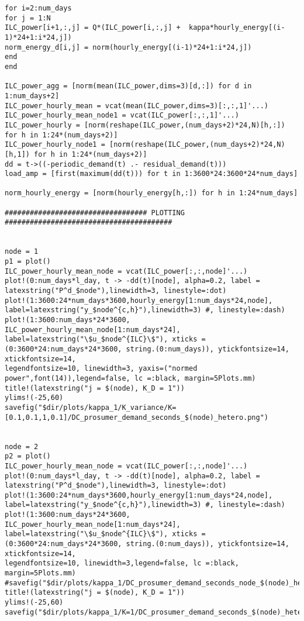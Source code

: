 \begin{lstlisting}
for i=2:num_days
for j = 1:N
ILC_power[i+1,:,j] = Q*(ILC_power[i,:,j] +  kappa*hourly_energy[(i-1)*24+1:i*24,j])
norm_energy_d[i,j] = norm(hourly_energy[(i-1)*24+1:i*24,j])
end
end

ILC_power_agg = [norm(mean(ILC_power,dims=3)[d,:]) for d in 1:num_days+2]
ILC_power_hourly_mean = vcat(mean(ILC_power,dims=3)[:,:,1]'...)
ILC_power_hourly_mean_node1 = vcat(ILC_power[:,:,1]'...)
ILC_power_hourly = [norm(reshape(ILC_power,(num_days+2)*24,N)[h,:]) for h in 1:24*(num_days+2)]
ILC_power_hourly_node1 = [norm(reshape(ILC_power,(num_days+2)*24,N)[h,1]) for h in 1:24*(num_days+2)]
dd = t->((-periodic_demand(t) .- residual_demand(t)))
load_amp = [first(maximum(dd(t))) for t in 1:3600*24:3600*24*num_days]

norm_hourly_energy = [norm(hourly_energy[h,:]) for h in 1:24*num_days]

################################## PLOTTING ########################################


node = 1
p1 = plot()
ILC_power_hourly_mean_node = vcat(ILC_power[:,:,node]'...)
plot!(0:num_days*l_day, t -> -dd(t)[node], alpha=0.2, label = latexstring("P^d_$node"),linewidth=3, linestyle=:dot)
plot!(1:3600:24*num_days*3600,hourly_energy[1:num_days*24,node], label=latexstring("y_$node^{c,h}"),linewidth=3) #, linestyle=:dash)
plot!(1:3600:num_days*24*3600,  ILC_power_hourly_mean_node[1:num_days*24], label=latexstring("\$u_$node^{ILC}\$"), xticks = (0:3600*24:num_days*24*3600, string.(0:num_days)), ytickfontsize=14,
xtickfontsize=14,
legendfontsize=10, linewidth=3, yaxis=("normed power",font(14)),legend=false, lc =:black, margin=5Plots.mm)
title!(latexstring("j = $(node), K_D = 1"))
ylims!(-25,60)
savefig("$dir/plots/kappa_1/K_variance/K=[0.1,0.1,1,0.1]/DC_prosumer_demand_seconds_$(node)_hetero.png")


node = 2
p2 = plot()
ILC_power_hourly_mean_node = vcat(ILC_power[:,:,node]'...)
plot!(0:num_days*l_day, t -> -dd(t)[node], alpha=0.2, label = latexstring("P^d_$node"),linewidth=3, linestyle=:dot)
plot!(1:3600:24*num_days*3600,hourly_energy[1:num_days*24,node], label=latexstring("y_$node^{c,h}"),linewidth=3) #, linestyle=:dash)
plot!(1:3600:num_days*24*3600,  ILC_power_hourly_mean_node[1:num_days*24], label=latexstring("\$u_$node^{ILC}\$"), xticks = (0:3600*24:num_days*24*3600, string.(0:num_days)), ytickfontsize=14,
xtickfontsize=14,
legendfontsize=10, linewidth=3,legend=false, lc =:black, margin=5Plots.mm)
#savefig("$dir/plots/kappa_1/DC_prosumer_demand_seconds_node_$(node)_hetero.png")
title!(latexstring("j = $(node), K_D = 1"))
ylims!(-25,60)
savefig("$dir/plots/kappa_1/K=1/DC_prosumer_demand_seconds_$(node)_hetero.png")


\end{lstlisting}
